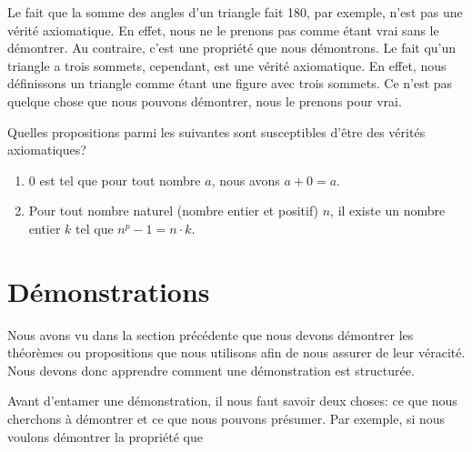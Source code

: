Le fait que la somme des angles d'un triangle fait 180\textdegree, par exemple, n'est pas une vérité axiomatique. En effet, nous ne le prenons pas comme étant vrai sans le démontrer. Au contraire, c'est une propriété que nous démontrons. Le fait qu'un triangle a trois sommets, cependant, est une vérité axiomatique. En effet, nous définissons un triangle comme étant une figure avec trois sommets. Ce n'est pas quelque chose que nous pouvons démontrer, nous le prenons pour vrai.

\begin{exercice}
    Quelles propositions parmi les suivantes sont susceptibles d'être des vérités axiomatiques?
    \begin{enumerate}
        \item 0 est tel que pour tout nombre $a$, nous avons $a+0 = a$.
        \item Pour tout nombre naturel (nombre entier et positif) $n$, il existe un nombre entier $k$ tel que $n^p - 1 = n\cdot k$.
    \end{enumerate}
\end{exercice}

\section{Démonstrations}

Nous avons vu dans la section précédente que nous devons démontrer les théorèmes ou propositions que nous utilisons afin de nous assurer de leur véracité. Nous devons donc apprendre comment une démonstration est structurée.

Avant d'entamer une démonstration, il nous faut savoir deux choses: ce que nous cherchons à démontrer et ce que nous pouvons présumer. Par exemple, si nous voulons démontrer la propriété que



